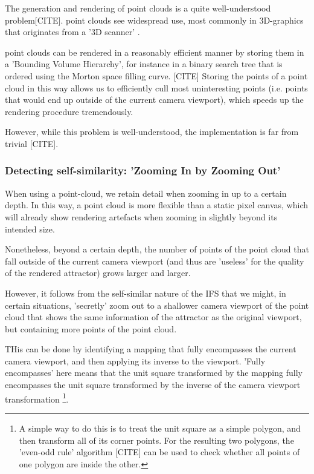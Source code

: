 \documentclass[11pt]{article}
\begin{document}
The generation and rendering of point clouds is a quite well-understood problem[CITE]. point clouds see widespread use,
most commonly in 3D-graphics that originates from a '3D scanner' .

point clouds can be rendered in a reasonably efficient manner by storing them in a 'Bounding Volume Hierarchy',
for instance in a binary search tree that is ordered using the Morton space filling curve. [CITE]
Storing the points of a point cloud in this way allows us to efficiently cull most uninteresting points (i.e. points that would end up outside of the current camera viewport),
which speeds up the rendering procedure tremendously.

However, while this problem is well-understood, the implementation is far from trivial [CITE].

\subsubsection{Detecting self-similarity: 'Zooming In by Zooming Out'}
\label{sec:org10f68ba}
\label{subsection:self_similarity}

When using a point-cloud, we retain detail when zooming in up to a certain depth. In this way, a point cloud is more flexible than a 
static pixel canvas, which will already show rendering artefacts when zooming in slightly beyond its intended size.

Nonetheless, beyond a certain depth, the number of points of the point cloud that fall outside of the current camera viewport
(and thus are 'useless' for the quality of the rendered attractor) grows larger and larger.

However, it follows from the self-similar nature of the IFS that we might, in certain situations,
'secretly' zoom out to a shallower camera viewport of the point cloud that shows the same information of the attractor
as the original viewport, but containing more points of the point cloud.

THis can be done by identifying a mapping that fully encompasses the current camera viewport, and then applying its inverse
to the viewport.
'Fully encompasses' here means that the unit square transformed by the mapping fully encompasses
the unit square transformed by the inverse of the camera viewport transformation \footnote{A simple way to do this is to treat the unit square as a simple polygon,
and then transform all of its corner points. For the resulting two polygons, the 'even-odd rule' algorithm
[CITE]
can be used to check whether all points of one polygon are inside the other.}.
\end{document}

